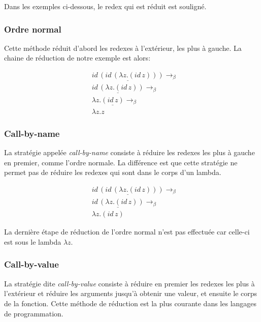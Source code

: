 Dans les exemples ci-dessous, le redex qui est réduit est souligné.

\subsubsection*{Ordre normal}

Cette méthode réduit d'abord les redexes à l'extérieur, les plus à gauche.
La chaine de réduction de notre exemple est alors:

\begin{align*}
  & \underline{id \, (id \, (\lambda z . (id \, z)))} \rightarrow_{\beta}\\
  & \underline{id \, (\lambda z . (id \, z))} \rightarrow_{\beta} \\
  & \lambda z . \underline{(id \, z)} \rightarrow_{\beta} \\
  & \lambda z . z
\end{align*}

\subsubsection*{Call-by-name}

La stratégie appelée \textit{call-by-name} consiste à réduire les redexes les plus
à gauche en premier, comme l'ordre normale. La différence est que cette stratégie
ne permet pas de réduire les redexes qui sont dans le corps d'un lambda.

\begin{align*}
  & \underline{id \, (id \, (\lambda z . (id \, z)))} \rightarrow_{\beta}\\
  & \underline{id \, (\lambda z . (id \, z))} \rightarrow_{\beta} \\
  & \lambda z . (id \, z)
\end{align*}

La dernière étape de réduction de l'ordre normal n'est pas effectuée car celle-ci est
sous le lambda $\lambda z$.

\subsubsection*{Call-by-value}

La stratégie dite \textit{call-by-value} consiste à réduire en premier les
redexes les plus à l'extérieur et réduire les arguments jusqu'à obtenir une valeur, et ensuite le corps de la fonction.
Cette méthode de réduction est la plus courante dans les langages de
programmation.

